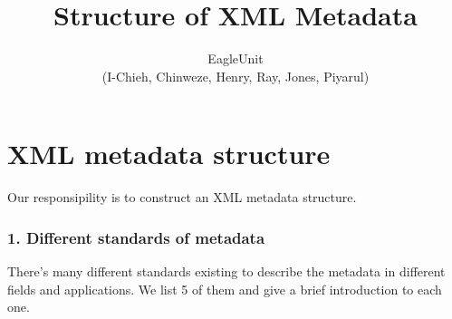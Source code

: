 \documentclass[a4paper]{article} %
\begin{document}

\title{Structure of XML Metadata}
\author{EagleUnit \\ (I-Chieh, Chinweze, Henry, Ray, Jones, Piyarul)} 

\maketitle                     %





\section{XML metadata structure}
\label{sec:abs}


Our responsipility is to construct an XML metadata structure.



\subsubsection*{1. Different standards of metadata}
\label{sec:mets}
There's many different standards existing to describe the metadata in different fields and applications. We list 5 of them and give a brief introduction to each one.
\end{document}
